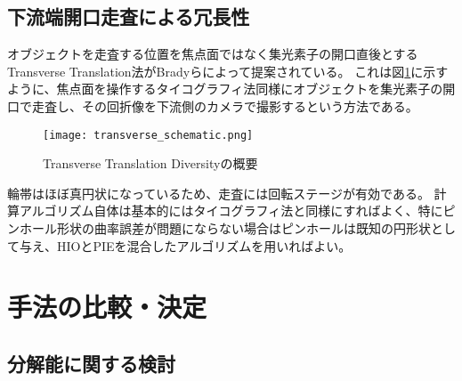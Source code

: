 \subsection{下流端開口走査による冗長性}
\label{chap3_transverse_introduction}

オブジェクトを走査する位置を焦点面ではなく集光素子の開口直後とするTransverse Translation法がBradyらによって提案されている。\cite{Brady2009}
これは図\ref{fig:transverse_schematic}に示すように、焦点面を操作するタイコグラフィ法同様にオブジェクトを集光素子の開口で走査し、その回折像を下流側のカメラで撮影するという方法である。

\begin{figure}[!ht]
\centering
\texttt{[image: transverse\_schematic.png]}
\caption{Transverse Translation Diversityの概要}
\label{fig:transverse_schematic}
\end{figure}

輪帯はほぼ真円状になっているため、走査には回転ステージが有効である。
計算アルゴリズム自体は基本的にはタイコグラフィ法と同様にすればよく、特にピンホール形状の曲率誤差が問題にならない場合はピンホールは既知の円形状として与え、HIOとPIEを混合したアルゴリズムを用いればよい。

\clearpage
\newpage

\section{手法の比較・決定}

\subsection{分解能に関する検討}
\label{chap3_comparison_resolution}

